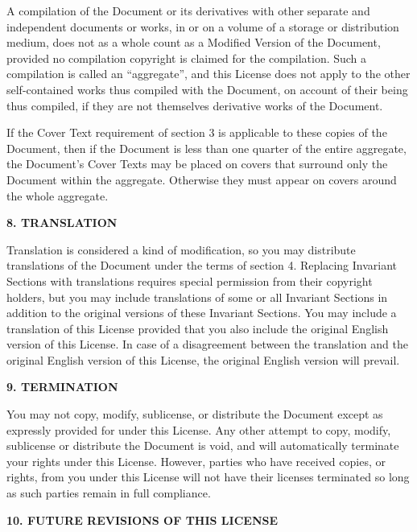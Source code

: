 A compilation of the Document or its derivatives with other separate
and independent documents or works, in or on a volume of a storage or
distribution medium, does not as a whole count as a Modified Version
of the Document, provided no compilation copyright is claimed for the
compilation.  Such a compilation is called an ``aggregate'', and this
License does not apply to the other self-contained works thus compiled
with the Document, on account of their being thus compiled, if they
are not themselves derivative works of the Document.

If the Cover Text requirement of section 3 is applicable to these
copies of the Document, then if the Document is less than one quarter
of the entire aggregate, the Document's Cover Texts may be placed on
covers that surround only the Document within the aggregate.
Otherwise they must appear on covers around the whole aggregate.


\begin{center}
{\Large\bf 8. TRANSLATION\par}
\end{center}

Translation is considered a kind of modification, so you may
distribute translations of the Document under the terms of section 4.
Replacing Invariant Sections with translations requires special
permission from their copyright holders, but you may include
translations of some or all Invariant Sections in addition to the
original versions of these Invariant Sections.  You may include a
translation of this License provided that you also include the
original English version of this License.  In case of a disagreement
between the translation and the original English version of this
License, the original English version will prevail.


\begin{center}
{\Large\bf 9. TERMINATION\par}
\end{center}

You may not copy, modify, sublicense, or distribute the Document except
as expressly provided for under this License.  Any other attempt to
copy, modify, sublicense or distribute the Document is void, and will
automatically terminate your rights under this License.  However,
parties who have received copies, or rights, from you under this
License will not have their licenses terminated so long as such
parties remain in full compliance.


\begin{center}
{\Large\bf 10. FUTURE REVISIONS OF THIS LICENSE\par}
\end{center}

